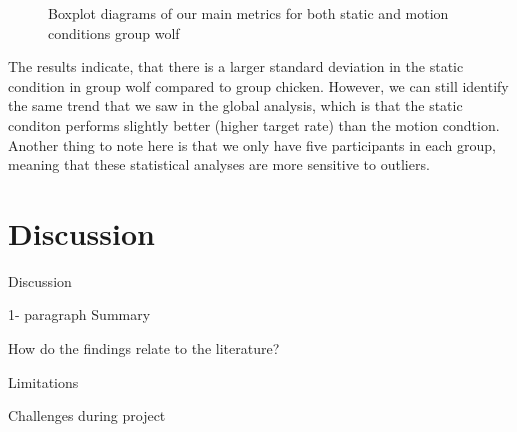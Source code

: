 \documentclass[
  12pt,
  letterpaper,
  DIV=11,
  numbers=noendperiod]{scrreprt}
\begin{document}
\begin{figure}


\caption{\label{fig-boxplot-wolf}Boxplot diagrams of our main metrics
for both static and motion conditions group wolf}

\end{figure}%

The results indicate, that there is a larger standard deviation in the
static condition in group wolf compared to group chicken. However, we
can still identify the same trend that we saw in the global analysis,
which is that the static conditon performs slightly better (higher
target rate) than the motion condtion. Another thing to note here is
that we only have five participants in each group, meaning that these
statistical analyses are more sensitive to outliers.

\chapter{Discussion}\label{sec-discussion}

Discussion

1- paragraph Summary

How do the findings relate to the literature?

Limitations

Challenges during project
\end{document}
